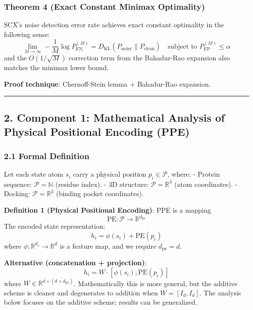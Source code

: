 \documentclass[
  12pt,
]{article}
\begin{document}
\subsubsection{Theorem 4 (Exact Constant Minimax Optimality)}\label{theorem-4-exact-constant-minimax}

SCX's noise detection error rate achieves exact constant optimality in the following sense:
\[\lim_{M \to \infty} -\frac{1}{M} \log P_{\text{FN}}^{(M)} = D_{\text{KL}}(P_{\text{noisy}} \| P_{\text{clean}}) \quad \text{subject to } P_{\text{FP}}^{(M)} \leq \alpha\]
and the $O(1/\sqrt{M})$ correction term from the Bahadur-Rao expansion also matches the minimax lower bound.

\textbf{Proof technique}: Chernoff-Stein lemma + Bahadur-Rao expansion.

\begin{center}\rule{0.5\linewidth}{0.5pt}\end{center}

\subsection{2. Component 1: Mathematical Analysis of Physical Positional Encoding (PPE)}\label{component-1-ppe-analysis}

\subsubsection{2.1 Formal Definition}\label{ppe-formal-definition}

Let each state atom $s_i$ carry a physical position $p_i \in \mathcal{P}$, where:
- Protein sequence: $\mathcal{P} = \mathbb{N}$ (residue index).
- 3D structure: $\mathcal{P} = \mathbb{R}^3$ (atom coordinates).
- Docking: $\mathcal{P} = \mathbb{R}^3$ (binding pocket coordinates).

\textbf{Definition 1 (Physical Positional Encoding)}: PPE is a mapping
\[\text{PE}: \mathcal{P} \to \mathbb{R}^{d_{\text{pe}}}\]
The encoded state representation: \[\boxed{h_i = \phi(s_i) + \text{PE}(p_i)}\]
where $\phi: \mathbb{R}^{d_s} \to \mathbb{R}^{d}$ is a feature map, and we require $d_{\text{pe}} = d$.

\textbf{Alternative (concatenation + projection)}:
\[h_i = W \cdot [\phi(s_i); \text{PE}(p_i)]\]
where $W \in \mathbb{R}^{d \times (d + d_{\text{pe}})}$. Mathematically this is more general, but the additive scheme is cleaner and degenerates to addition when $W = [I_d, I_d]$. The analysis below focuses on the additive scheme; results can be generalized.
\end{document}
